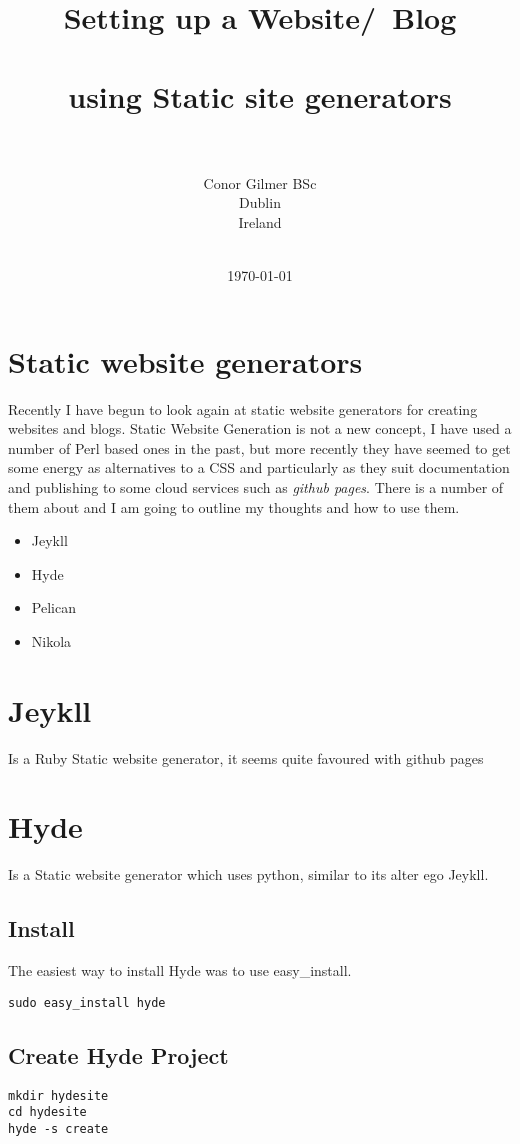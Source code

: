 \documentclass[12pt]{article}			%
\title{Setting up a Website/\ Blog\\~\\ using Static site generators\\~\\}	%
\author{	Conor Gilmer BSc\\	%
		Dublin \\
		Ireland \\~\\
		}
\date{\today}				%
\begin{document}
\maketitle
\newpage
\tableofcontents
\newpage

\section{Static website generators}
Recently I have begun to look again at static website generators for creating websites and blogs. Static Website Generation is not a new concept, I have used a number of Perl based ones in the past, but more recently they have seemed to get some energy as alternatives to a CSS and particularly as they suit documentation and publishing to some cloud services such as \textit{github pages}. There is a number of them about and I am going to outline my thoughts and how to use them.
\begin{itemize}
\item Jeykll
\item Hyde
\item Pelican
\item Nikola
\end{itemize}


\newpage
\section{Jeykll}
Is a Ruby Static website generator, it seems quite favoured with github pages

\newpage
\section{Hyde}
Is a Static website generator which uses python, similar to its alter ego Jeykll.


\subsection{Install}
The easiest way to install Hyde was to use easy\_install.
\begin{verbatim}
sudo easy_install hyde
\end{verbatim}

\subsection{Create Hyde Project}
\begin{verbatim}
mkdir hydesite
cd hydesite
hyde -s create

\end{verbatim}
\end{document}
